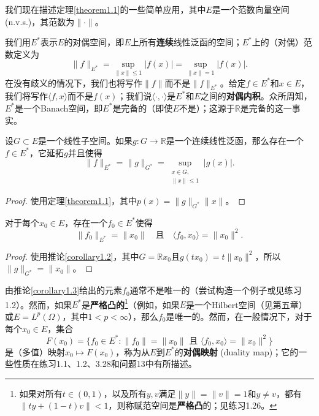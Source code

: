 我们现在描述定理\ref{theorem1.1}的一些简单应用，其中$E$是一个范数向量空间(n.v.s.)，其范数为$\| \cdot \|$。

我们用$E^*$表示$E$的对偶空间，即$E$上所有\textbf{连续}线性泛函的空间；$E^*$上的（对偶）范数定义为
\begin{equation}\label{eq5}
\|f\|_{E^*} = \sup_{\|x\| \leq 1} |f(x)| = \sup_{\|x\|=1} |f(x)|.
\end{equation}
在没有歧义的情况下，我们也将写作$\|f\|$而不是$\|f\|_{E^*}$。给定$f \in E^*$和$x \in E$，我们将写作$\langle f, x \rangle$而不是$f(x)$；我们说$\langle \cdot, \cdot \rangle$是$E^*$和$E$之间的\textbf{对偶内积}。众所周知，$E^*$是一个Banach空间，即$E^*$是完备的（即使$E$不是）；这源于$\mathbb{R}$是完备的这一事实。

\begin{corollary}\label{corollary1.2}
设$G \subset E$是一个线性子空间。如果$g: G \to \mathbb{R}$是一个连续线性泛函，那么存在一个$f \in E^*$，它延拓$g$并且使得
\[ \|f\|_{E^*} = \|g\|_{G^*} = \sup_{\substack{x \in G, \\ \|x\| \leq 1}} |g(x)|. \]
\end{corollary}
\begin{proof}
使用定理\ref{theorem1.1}，其中$p(x) = \|g\|_{G^*} \|x\|$。
\end{proof}

\begin{corollary}\label{corollary1.3}
对于每个$x_0 \in E$，存在一个$f_0 \in E^*$使得
\[ \|f_0\|_{E^*} = \|x_0\| \quad \text{且} \quad \langle f_0, x_0 \rangle = \|x_0\|^2. \]
\end{corollary}
\begin{proof}
使用推论\ref{corollary1.2}，其中$G=\mathbb{R}x_0$且$g(tx_0) = t\|x_0\|^2$，所以$\|g\|_{G^*} = \|x_0\|$。
\end{proof}

\begin{remark}
由推论\ref{corollary1.3}给出的元素$f_0$通常不是唯一的（尝试构造一个例子或见练习1.2）。然而，如果$E^*$是\textbf{严格凸的}\footnote{如果对所有$t \in (0,1)$，以及所有$y, v$满足$\|y\|=\|v\|=1$和$y \neq v$，都有$\|ty+(1-t)v\| < 1$，则称赋范空间是\textbf{严格凸}的；见练习1.26。}（例如，如果$E$是一个Hilbert空间（见第五章）或$E = L^p(\Omega)$，其中$1 < p < \infty$），那么$f_0$是唯一的。然而，在一般情况下，对于每个$x_0 \in E$，集合
\[ F(x_0) = \{f_0 \in E^* : \|f_0\| = \|x_0\| \text{ 且 } \langle f_0, x_0 \rangle = \|x_0\|^2 \} \]
是（多值）映射$x_0 \mapsto F(x_0)$，称为从$E$到$E^*$的\textbf{对偶映射} (duality map)；它的一些性质在练习1.1、1.2、3.28和问题13中有所描述。
\end{remark}

